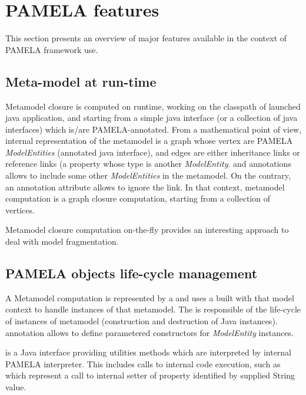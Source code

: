
\section{PAMELA features}

This section presents an overview of major features available in the context of PAMELA framework use.

\subsection{Meta-model at run-time}

Metamodel closure is computed on runtime, working on the classpath of launched java application, and starting from a simple java interface (or a collection of java interfaces) which is/are PAMELA-annotated. From a mathematical point of view, internal representation of the metamodel is a graph whose vertex are PAMELA \emph{ModelEntities} (annotated java interface), and edges are either inheritance links or reference links (a property whose type is another \emph{ModelEntity}.  and  annotations allows to include some other \emph{ModelEntities} in the metamodel. On the contrary, an annotation attribute  allows to ignore the link. In that context, metamodel computation is a graph closure computation, starting from a collection of vertices. 

Metamodel closure computation on-the-fly provides an interesting approach to deal with model fragmentation.


\subsection{PAMELA objects life-cycle management}

A Metamodel computation is represented by a  and uses a  built with that model context to handle instances of that metamodel. The  is responsible of the life-cycle of instances of metamodel (construction and destruction of Java instances).  annotation allows to define parametered constructors for \emph{ModelEntity} instances.

 is a Java interface providing utilities methods which are interpreted by internal PAMELA interpreter. This includes calls to internal code execution, such as  which represent a call to internal setter of property identified by supplied String value.

